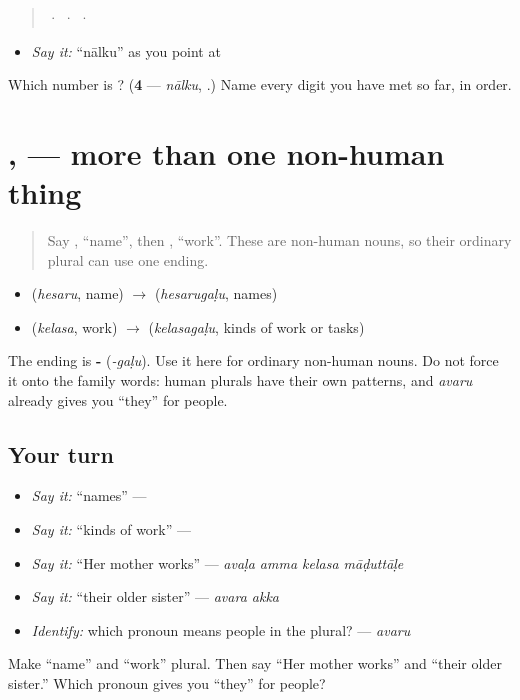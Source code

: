\begin{quote}
  ·    ·    ·  
\end{quote}

\begin{itemize}
\raggedright
  \item \emph{Say it:} \textquotedblleft{}nālku\textquotedblright{} as you point at 
\end{itemize}

\begin{tcolorbox}[breakable,colback=teal!4,colframe=teal!35!black,title={Before you move on}]
Which number is \textbf{}? (\textbf{4} — \emph{nālku}, .) Name every digit you have met so far, in order.
\end{tcolorbox}
\section[\texorpdfstring{\kn{ಹೆಸರುಗಳು} \kn{ಕೆಲಸಗಳು} (hesarugaḷu kelasagaḷu)}{ಹೆಸರುಗಳು ಕೆಲಸಗಳು (hesarugaḷu kelasagaḷu)}]{,  — more than one non-human thing}

\label{lesson:KA-C12-plural-galu}



\begin{quote}
Say \textbf{}, “name”, then \textbf{}, “work”. These are non-human nouns, so their ordinary plural can use one ending.
\end{quote}

\begin{grammarlens}[title={Grammar Lens: add -\kn{ಗಳು}}]
\begin{itemize}
\raggedright
  \item \textbf{} (\emph{hesaru}, name) $\to$ \textbf{} (\emph{hesarugaḷu}, names)
  \item \textbf{} (\emph{kelasa}, work) $\to$ \textbf{} (\emph{kelasagaḷu}, kinds of work or tasks)
\end{itemize}

The ending is \textbf{-} (\emph{-gaḷu}). Use it here for ordinary non-human nouns. Do not force it onto the family words: human plurals have their own patterns, and \emph{avaru} already gives you “they” for people.
\end{grammarlens}

\subsection*{Your turn}
\begin{itemize}
\raggedright
  \item \emph{Say it:} “names” — \textbf{}
  \item \emph{Say it:} “kinds of work” — \textbf{}
  \item \emph{Say it:} “Her mother works” — \emph{avaḷa amma kelasa māḍuttāḷe}
  \item \emph{Say it:} “their older sister” — \emph{avara akka}
  \item \emph{Identify:} which pronoun means people in the plural? — \emph{avaru}
\end{itemize}

\begin{tcolorbox}[breakable,colback=teal!4,colframe=teal!35!black,title={Before you move on}]
Make “name” and “work” plural. Then say “Her mother works” and “their older sister.” Which pronoun gives you “they” for people?
\end{tcolorbox}

